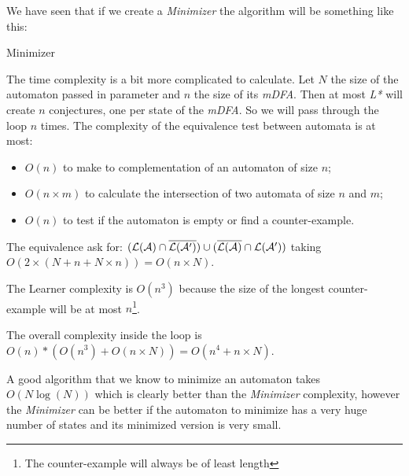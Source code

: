 We have seen that if we create a \textit{Minimizer} the algorithm will be something like this:

\begin{algorithm}[h]
  \caption{Minimizer}

\end{algorithm}



The time complexity is a bit more complicated to calculate. Let $N$ the size of the automaton passed in parameter and $n$ the size of its \textit{mDFA}. Then at most \textit{L*} will create $n$ conjectures, one per state of the \textit{mDFA}. So we will pass through the loop $n$ times. The complexity of the equivalence test between automata is at most:
\begin{itemize}
  \item $O(n)$ to make to complementation of an automaton of size $n$;
  \item $O(n \times m)$ to calculate the intersection of two automata of size $n$ and $m$;
  \item $O(n)$ to test if the automaton is empty or find a counter-example.
\end{itemize}
The equivalence ask for: $(\mathcal{L}(\mathcal{A}) \cap \overline{\mathcal{L}(\mathcal{A}')}) \cup (\overline{\mathcal{L}(\mathcal{A})} \cap \mathcal{L}(\mathcal{A}'))$ taking $O(2 \times (N + n + N \times n)) = O(n \times N)$.

The Learner complexity is $O(n^3)$ because the size of the longest counter-example will be at most $n$\footnote{The counter-example will always be of least length}.

The overall complexity inside the loop is $O(n)*(O(n^3) + O(n \times N)) = O(n^4 + n \times N)$.

A good algorithm that we know to minimize an automaton takes $O(N \log(N))$ which is clearly better than the \textit{Minimizer} complexity, however the \textit{Minimizer} can be better if the automaton to minimize has a very huge number of states and its minimized version is very small.

